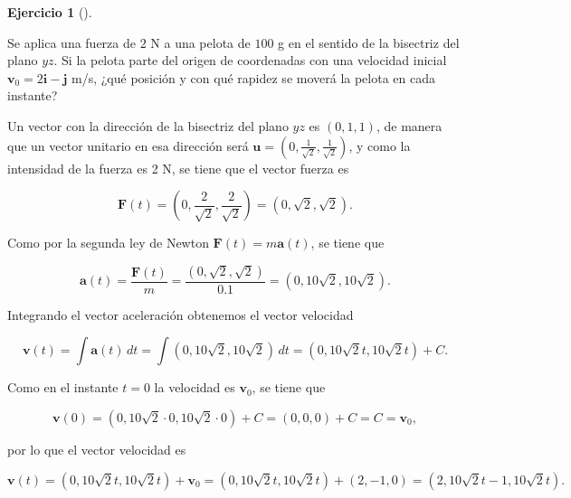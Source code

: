 \documentclass[
  spanish,
  a4paper,
]{scrreport}
\theoremstyle{definition}
\newtheorem{exercise}{Ejercicio}[chapter]
\theoremstyle{remark}
\begin{document}
\begin{exercise}[]\protect\hypertarget{exr-cinematica-fuerza-2}{}\label{exr-cinematica-fuerza-2}

Se aplica una fuerza de \(2\) N a una pelota de \(100\) g en el sentido
de la bisectriz del plano \(yz\). Si la pelota parte del origen de
coordenadas con una velocidad inicial
\(\mathbf{v}_0 = 2\mathbf{i}-\mathbf{j}\) m/s, ¿qué posición y con qué
rapidez se moverá la pelota en cada instante?

\end{exercise}

\begin{tcolorbox}[enhanced jigsaw, arc=.35mm, bottomrule=.15mm, bottomtitle=1mm, breakable, colback=white, colbacktitle=quarto-callout-tip-color!10!white, colframe=quarto-callout-tip-color-frame, coltitle=black, left=2mm, leftrule=.75mm, opacityback=0, opacitybacktitle=0.6, rightrule=.15mm, title=\textcolor{quarto-callout-tip-color}{\faLightbulb}\hspace{0.5em}{Solución}, titlerule=0mm, toprule=.15mm, toptitle=1mm]

Un vector con la dirección de la bisectriz del plano \(yz\) es
\((0,1,1)\), de manera que un vector unitario en esa dirección será
\(\mathbf{u}=\left(0,\frac{1}{\sqrt{2}},\frac{1}{\sqrt{2}}\right)\), y
como la intensidad de la fuerza es 2 N, se tiene que el vector fuerza es

\[
\mathbf{F}(t)
= \left(0,\frac{2}{\sqrt{2}},\frac{2}{\sqrt{2}}\right) 
= (0, \sqrt{2},\sqrt{2}).
\]

Como por la segunda ley de Newton \(\mathbf{F}(t)=m\mathbf{a}(t)\), se
tiene que

\[
\mathbf{a}(t)
= \frac{\mathbf{F}(t)}{m}
= \frac{(0, \sqrt{2},\sqrt{2})}{0.1} 
= (0, 10\sqrt{2}, 10\sqrt{2}).
\]

Integrando el vector aceleración obtenemos el vector velocidad

\[
\mathbf{v}(t)
= \int \mathbf{a}(t)\, dt
= \int (0, 10\sqrt{2}, 10\sqrt{2})\, dt 
= (0, 10\sqrt{2}t, 10\sqrt{2}t) + C.
\]

Como en el instante \(t=0\) la velocidad es \(\mathbf{v}_0\), se tiene
que

\[
\mathbf{v}(0) 
= (0, 10\sqrt{2}\cdot 0, 10\sqrt{2}\cdot 0) + C 
= (0,0,0) + C  
= C 
= \mathbf{v}_0,
\]

por lo que el vector velocidad es

\[
\mathbf{v}(t)
= (0, 10\sqrt{2}t, 10\sqrt{2}t) + \mathbf{v}_0
= (0, 10\sqrt{2}t, 10\sqrt{2}t) + (2, -1, 0)
= (2, 10\sqrt{2}t-1, 10\sqrt{2}t).
\]


\end{tcolorbox}
\end{document}
